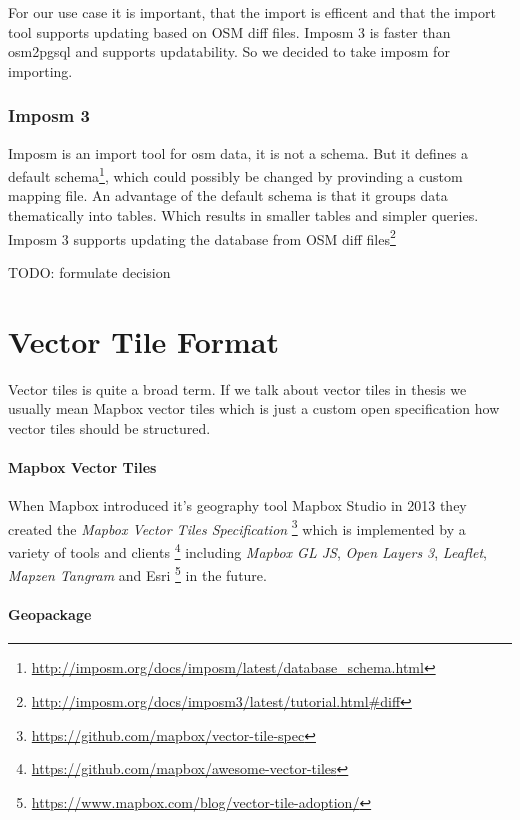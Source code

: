For our use case it is important, that the import is efficent and that
the import tool supports updating based on OSM diff files. Imposm 3 is
faster than osm2pgsql and supports updatability. So we decided to take
imposm for importing.

\subsubsection{Imposm 3 }\label{imposm-importer}

Imposm is an import tool for osm data, it is not a schema. But it
defines a default
schema\footnote{\url{http://imposm.org/docs/imposm/latest/database_schema.html}},
which could possibly be changed by provinding a custom mapping file. An
advantage of the default schema is that it groups data thematically into
tables. Which results in smaller tables and simpler queries. Imposm 3
supports updating the database from OSM diff
files\footnote{\url{http://imposm.org/docs/imposm3/latest/tutorial.html\#diff}}

TODO: formulate decision

\section{Vector Tile Format}\label{vector-tile-formats}

Vector tiles is quite a broad term. If we talk about vector tiles in thesis we usually mean Mapbox vector tiles which is just a custom open specification how vector tiles should be structured.

\paragraph{Mapbox Vector Tiles}

When Mapbox introduced it's geography tool Mapbox Studio in 2013 they
created the \emph{Mapbox Vector Tiles Specification}
\footnote{\url{https://github.com/mapbox/vector-tile-spec}} which is
implemented by a variety of tools and clients
\footnote{\url{https://github.com/mapbox/awesome-vector-tiles}}
including \emph{Mapbox GL JS}, \emph{Open Layers 3}, \emph{Leaflet},
\emph{Mapzen Tangram} and Esri
\footnote{\url{https://www.mapbox.com/blog/vector-tile-adoption/}} in
the future.

\paragraph{Geopackage}

